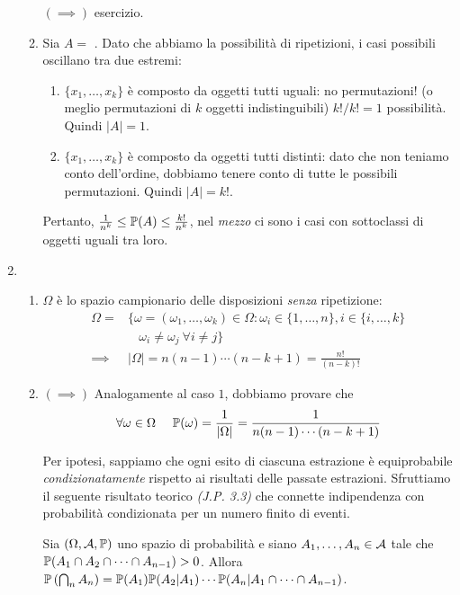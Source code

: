 \begin{enumerate}
\begin{enumerate}
		$(\implies)$ esercizio.
		\item Sia $A=$ . Dato che abbiamo la possibilità di ripetizioni, i casi possibili oscillano tra due estremi:
		\begin{enumerate}
			\item $\{x_{1},\dots,x_{k}\}$ è composto da oggetti tutti uguali: no permutazioni! (o meglio permutazioni di $k$ oggetti indistinguibili) $k!/k!=1$ possibilità. Quindi $| A| =1$.
			\item $\{x_{1},\dots,x_{k}\}$ è composto da oggetti tutti distinti: dato che non teniamo conto dell'ordine, dobbiamo tenere conto di tutte le possibili permutazioni. Quindi $| A| =k!$.
		\end{enumerate}

		Pertanto, $\frac{1}{n^{k}} \leq \mathbb{P}(A) \leq \frac{k!}{n^{k}}$, nel \textit{mezzo} ci sono i casi con sottoclassi di oggetti uguali tra loro.
	\end{enumerate}
	\item 
	\begin{enumerate}
		\item $\Omega $ è lo spazio campionario delle disposizioni \textit{senza} ripetizione:
		\begin{align*}
			\Omega = & \{\omega =(\omega_{1} ,\dots ,\omega_{k}) \in \Omega :\omega_{i} \in \{1,\dots,n\} ,i\in \{i,\dots,k\}\\
			 & \ \ \ \ \omega_{i} \neq \omega_{j} \ \forall i\neq j\}\\
			\implies  & | \Omega | =n(n-1) \cdots (n-k+1) =\frac{n!}{(n-k) !}
		\end{align*}
		\item $(\implies)$ Analogamente al caso $1$, dobbiamo provare che
		\begin{equation*}
			\forall \omega \in \Omega \ \ \ \ \mathbb{P}(\omega) =\frac{1}{| \Omega | } =\frac{1}{n(n-1) \cdots (n-k+1)}
		\end{equation*}

		Per ipotesi, sappiamo che ogni esito di ciascuna estrazione è equiprobabile \textit{condizionatamente} rispetto ai risultati delle passate estrazioni. Sfruttiamo il seguente risultato teorico \textit{(J.P. 3.3)} che connette indipendenza con probabilità condizionata per un numero finito di eventi.

		Sia $(\Omega,\mathcal{A},\mathbb{P})$ uno spazio di probabilità e siano $A_{1} ,\dots ,A_{n} \in \mathcal{A}$ tale che $\mathbb{P}(A_{1} \cap A_{2} \cap \cdots \cap A_{n-1})  >0$. Allora $\mathbb{P}\left(\bigcap_{n} A_{n}\right) =\mathbb{P}(A_{1})\mathbb{P}(A_{2} |A_{1}) \cdots \mathbb{P}(A_{n} |A_{1} \cap \cdots \cap A_{n-1})$.


\end{enumerate}
\end{enumerate}
